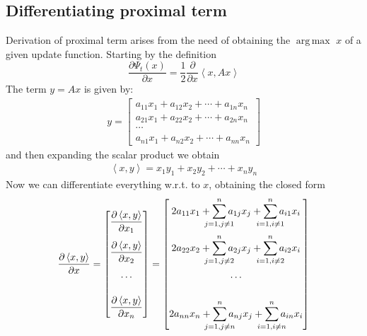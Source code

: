 \documentclass[notitlepage]{article}
\DeclareMathOperator*{\argmax}{arg\,max}
\begin{document}
\subsection{Differentiating proximal term}
Derivation of proximal term arises from the need of obtaining the $\argmax$ $x$ of a given update function. Starting by the definition
\[
  \frac{\partial \Psi_t(x)}{\partial x} = \frac{1}{2} \frac{\partial}{\partial x} \left\langle x, A x \right\rangle  
\]
The term $y = A x$ is given by:
\begin{align*}
  y = 
  \begin{bmatrix}
    a_{11}x_1 + a_{12}x_2 + \cdots + a_{1n}x_n \\[2ex]
    a_{21}x_1 + a_{22}x_2 + \cdots + a_{2n}x_n \\[2ex]
    \cdots \\
    a_{n1}x_1 + a_{n2}x_2 + \cdots + a_{nn}x_n 
  \end{bmatrix}
\end{align*}
and then expanding the scalar product we obtain
\begin{align*}
  \left\langle x,y \right\rangle = x_1 y_1 + x_2 y_2 + \cdots + x_n y_n
\end{align*}
Now we can differentiate everything w.r.t. to $x$, obtaining the closed form
\begin{align*}
  \frac{\partial \left\langle x,y \right\rangle}{\partial x} = 
  \begin{bmatrix}
    \dfrac{\partial \left\langle x,y \right\rangle}{\partial x_1} \\[3ex]
    \dfrac{\partial \left\langle x,y \right\rangle}{\partial x_2} \\[3ex]
    \cdots \\[3ex]
    \dfrac{\partial \left\langle x,y \right\rangle}{\partial x_n} 
  \end{bmatrix}
  = 
  \begin{bmatrix}
    2 a_{11}x_1 + \displaystyle \sum_{\mathclap{j=1, j \neq 1}}^n a_{1j} x_j + \sum_{\mathclap{i=1, i \neq 1}}^n a_{i1} x_i \\[4ex]
    2 a_{22}x_2 + \displaystyle \sum_{\mathclap{j=1, j \neq 2}}^n a_{2j} x_j + \sum_{\mathclap{i=1, i \neq 2}}^n a_{i2} x_i \\[4ex]
    \cdots \\[4ex]
    2 a_{nn}x_n + \displaystyle \sum_{\mathclap{j=1, j \neq n}}^n a_{nj} x_j + \sum_{\mathclap{i=1, i \neq n}}^n a_{in} x_i \\
  \end{bmatrix}
\end{align*}
\end{document}
